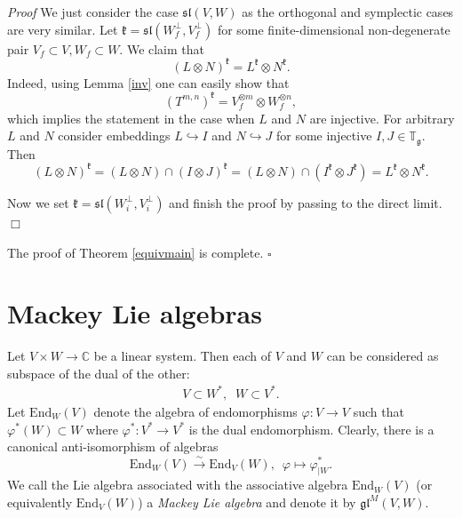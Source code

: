 \documentclass{svmult}
\renewenvironment{proof}{ \emph{Proof}}{$\Box$}
\newcommand {\CC} {\mathbb {C}}
\newcommand{\TT}{\mathbb{T}}
\renewcommand{\sl}{\mathfrak{sl}}
\newcommand{\kk}{\mathfrak{k}}
\renewcommand{\gg}{\mathfrak{g}}
\renewcommand {\phi} {\varphi}
\newcommand{\gl}{\mathfrak{gl}}
\newcommand{\End}{\mathrm{End}}
\begin{document}
\begin{proof} We just consider the case $\sl(V,W)$ as the  orthogonal and symplectic cases are very similar.
Let $\kk=\sl(W_f^\perp,V_f^\perp)$ for some finite-dimensional
non-degenerate pair 
$V_f \subset V ,W_f \subset W$. We claim that 
$$(L\otimes N)^{\kk}=L^\kk\otimes N^\kk.$$
Indeed, using Lemma \ref{inv} one can easily show that 
$$(T^{m,n})^{\kk}=V_f^{\otimes m}\otimes W_f^{\otimes n},$$
which implies the statement in the case when $L$ and $N$ are injective.
For arbitrary $L$ and $N$ consider embeddings $L\hookrightarrow I$ and $N\hookrightarrow J$
for some injective $I,J\in\TT_\gg$. Then
$$(L\otimes N)^\kk=(L\otimes N)\cap (I\otimes J)^\kk=(L\otimes N)\cap (I^\kk\otimes J^\kk)=L^\kk\otimes N^\kk.$$

Now we set $\kk=\sl(W_i^{\perp},V_i^{\perp})$ and finish the proof by passing to the direct limit.
\end{proof}

\vspace{0.5cm}

The proof of Theorem \ref{equivmain} is complete. $\square$

\section{Mackey Lie algebras}\label{sect:6}
Let $V \times W \rightarrow \CC$ be a linear system.
Then each of $V$ and $W$ can be considered as subspace of 
the dual of the other:
\begin{eqnarray}
 V \subset W^*, \;\;W \subset V^*. \nonumber
\end{eqnarray}
Let $\End_W(V)$ denote the algebra of endomorphisms $\phi: V \rightarrow V$ such that $\phi^*(W) \subset W$ where $\phi^*: V^* \rightarrow V^*$ is the dual 
endomorphism. Clearly, there is a canonical anti-isomorphism of algebras
\begin{equation}\label{rel:canonic}
 \End_W(V) \stackrel{\sim}{\rightarrow} \End_V(W), \,\,\, \phi \longmapsto \phi^*_{|W}.\nonumber
\end{equation}
We call the Lie algebra associated with the associative algebra $\End_W(V)$ (or equivalently  $\End_V(W)$) a \textit{Mackey Lie algebra} and denote it by 
$\gl^M(V,W)$.
\end{document}
